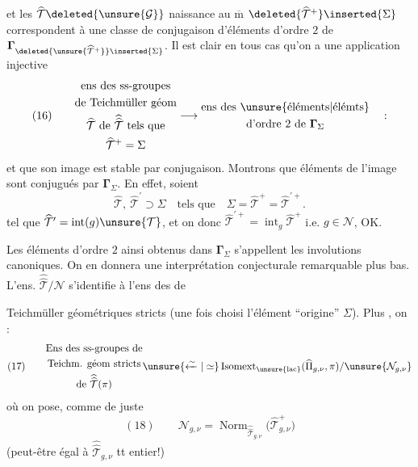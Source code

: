 et les $\widehat{\mathcal{T}}\deleted{\unsure{\mathcal G}}$  naissance au $\overline{\mathrm m}$ $\deleted{\widehat{\mathcal{T}}^{+}}\inserted{\Sigma}$ correspondent  à une classe de conjugaison d'éléments d'ordre $2$ de $\boldsymbol{\Gamma}_{\deleted{\unsure{\widehat{\mathcal{T}}^{+}}}\inserted{\Sigma}}$. Il est clair  en tous cas qu'on a une application injective
\[
(16)\qquad
\begin{gathered}
\text{ens des ss-groupes}\\
\text{de Teichmüller géom}\\
\widehat{\mathcal{T}}\text{ de }\widehat{\widehat{\mathcal{T}}}\text{ tels que}\\
\widehat{\mathcal{T}}^{+}=\Sigma
\end{gathered}
\longrightarrow
\begin{gathered}
\text{ens des }\unsure{\text{éléments}|\text{élémts}}\\
\text{d'ordre }2\text{ de }\boldsymbol{\Gamma}_{\Sigma}
\end{gathered}
\quad :
\]
et que son image est stable par conjugaison. Montrons que  éléments de l'image sont conjugués par $\boldsymbol{\Gamma}_{\Sigma}$. En effet, soient
\[
\widehat{\mathcal{T}},\ \widehat{\mathcal{T}}^{\prime}\supset\Sigma
\quad\text{tels que}\quad
\Sigma=\widehat{\mathcal{T}}^{+}=\widehat{\mathcal{T}}^{\prime+}.
\]
tel que
$\widehat{\mathcal{T}}^{\prime}=\operatorname{int}(g)\unsure{\mathcal{T}}$,
et on  donc
$\widehat{\mathcal{T}}^{\prime+}=\operatorname{int}_{g}\widehat{\mathcal{T}}^{+}$
i.e. $g\in\mathcal{N}$, OK.

Les éléments d'ordre $2$ ainsi obtenus dans $\boldsymbol{\Gamma}_{\Sigma}$ s'appellent les involutions canoniques. On en donnera une interprétation conjecturale remarquable plus bas. L'ens. $\widehat{\widehat{\mathcal{T}}}/\mathcal{N}$ s'identifie à l'ens des  de


Teichmüller géométriques stricts (une fois choisi l'élément ``origine'' $\Sigma$). Plus , on :
\[
(17)\qquad
\begin{gathered}
\text{Ens des ss-groupes de}\\
\text{Teichm. géom stricts}\\
\text{de }\widehat{\widehat{\mathcal{T}}}(\pi)
\end{gathered}
\unsure{\xleftarrow{\sim}|\simeq}
\operatorname{Isomext}_{\unsure{\mathrm{lac}}}
(\widehat{\Pi}_{g,\nu},\pi)/\unsure{\mathcal{N}_{g,\nu}}
\]
où on pose, comme de juste
\[
(18)\qquad
\mathcal{N}_{g,\nu}
=\operatorname{Norm}_{\widehat{\widehat{\mathcal{T}}}_{g,\nu}}
\bigl(\widehat{\mathcal{T}}_{g,\nu}^{+}\bigr)
\]
(peut-être égal à $\widehat{\widehat{\mathcal{T}}}_{g,\nu}$ tt entier!)

